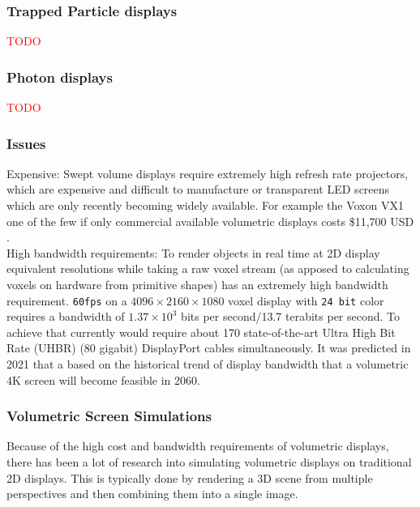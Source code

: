 \subsubsection{Trapped Particle displays}
{\textcolor{red}{TODO}}

\subsubsection{Photon displays}
{\textcolor{red}{TODO}}

\subsubsection{Issues}

Expensive: Swept volume displays require extremely high refresh rate projectors, which are expensive and difficult to manufacture or transparent LED screens which are only recently becoming widely available. For example the Voxon VX1 one of the few if only commercial available volumetric displays costs \$11,700 USD \cite{noauthor_products_nodate}. \\

High bandwidth requirements: To render objects in real time at 2D display equivalent resolutions while taking a raw voxel stream (as apposed to calculating voxels on hardware from primitive shapes) has an extremely high bandwidth requirement. \texttt{60fps} on a $4096 \times 2160 \times 1080$ voxel display with \texttt{24 bit} color requires a bandwidth of $1.37 \times 10^3$ bits per second/13.7 terabits per second. To achieve that currently would require about 170 state-of-the-art Ultra High Bit Rate (UHBR) (80 gigabit) DisplayPort cables simultaneously. It was predicted in 2021 \cite{LAM2021050011} that a based on the historical trend of display bandwidth that a volumetric 4K screen will become feasible in 2060.

\subsubsection{Volumetric Screen Simulations}
Because of the high cost and bandwidth requirements of volumetric displays, there has been a lot of research into simulating volumetric displays on traditional 2D displays. This is typically done by rendering a 3D scene from multiple perspectives and then combining them into a single image. \cite{10.1145/3290605.3300763}